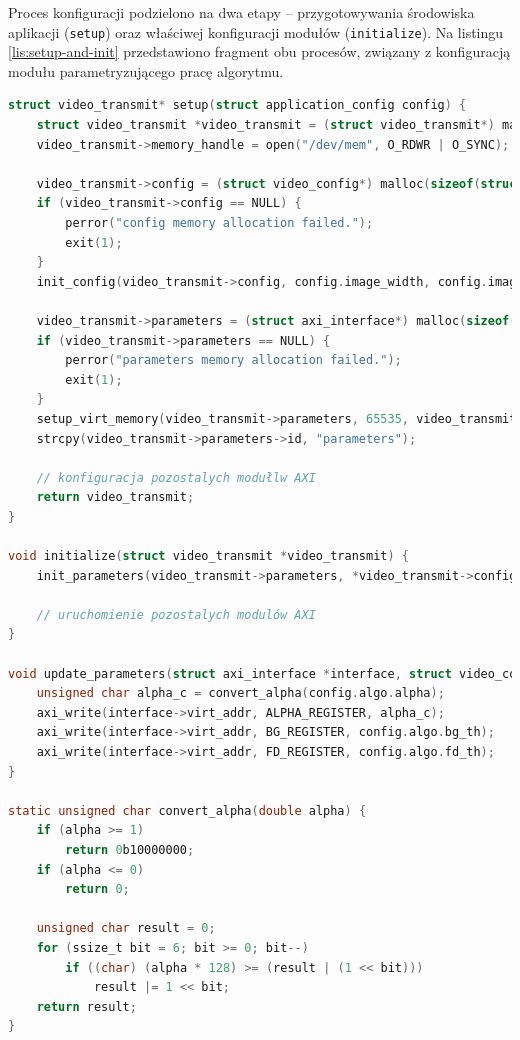 Proces konfiguracji podzielono na dwa etapy -- przygotowywania środowiska aplikacji (\texttt{setup}) oraz właściwej konfiguracji modułów (\texttt{initialize}). 
Na listingu \ref{lis:setup-and-init} przedstawiono fragment obu procesów, związany z konfiguracją modułu parametryzującego pracę algorytmu.

\begin{lstlisting}[breaklines,language=C, label=lis:setup-and-init, caption=Konfiguracja modułu parametryzującego pracę algorytmu.]
struct video_transmit* setup(struct application_config config) {
	struct video_transmit *video_transmit = (struct video_transmit*) malloc(sizeof(struct video_transmit));
	video_transmit->memory_handle = open("/dev/mem", O_RDWR | O_SYNC);
		
	video_transmit->config = (struct video_config*) malloc(sizeof(struct video_config));
	if (video_transmit->config == NULL) {
		perror("config memory allocation failed.");
		exit(1);
	}
	init_config(video_transmit->config, config.image_width, config.image_height, config.alpha, config.bg_th, config.fd_th);
	
	video_transmit->parameters = (struct axi_interface*) malloc(sizeof(struct axi_interface));
	if (video_transmit->parameters == NULL) {
		perror("parameters memory allocation failed.");
		exit(1);
	}
	setup_virt_memory(video_transmit->parameters, 65535, video_transmit->memory_handle, algorithm_parameters_addr);
	strcpy(video_transmit->parameters->id, "parameters");
	
	// konfiguracja pozostalych modułlw AXI
	return video_transmit;
}

void initialize(struct video_transmit *video_transmit) {
	init_parameters(video_transmit->parameters, *video_transmit->config);
	
	// uruchomienie pozostalych modulów AXI
}

void update_parameters(struct axi_interface *interface, struct video_config config) {
	unsigned char alpha_c = convert_alpha(config.algo.alpha);
	axi_write(interface->virt_addr, ALPHA_REGISTER, alpha_c);
	axi_write(interface->virt_addr, BG_REGISTER, config.algo.bg_th);
	axi_write(interface->virt_addr, FD_REGISTER, config.algo.fd_th);
}

static unsigned char convert_alpha(double alpha) {
	if (alpha >= 1)
		return 0b10000000;
	if (alpha <= 0)
		return 0;
	
	unsigned char result = 0;
	for (ssize_t bit = 6; bit >= 0; bit--)
		if ((char) (alpha * 128) >= (result | (1 << bit)))
			result |= 1 << bit;
	return result;
}
\end{lstlisting}

